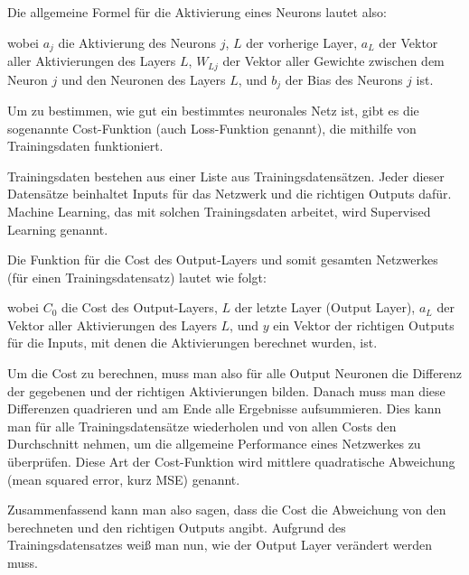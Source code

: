 \documentclass[11pt]{scrartcl}
\begin{document}
	Die allgemeine Formel für die Aktivierung eines Neurons lautet also:


	\form{
	\[
		\sig(x)=\frac{1}{1+e^{-x}}
		\]
	\[
		a_{j} = \sig\left(\sum_{L} (a_{L} * W_{Lj}) + b_{j}\right)
		\]}
	
	\noindent wobei $a_j$ die Aktivierung des Neurons $j$, $L$ der vorherige Layer, $a_L$ der Vektor aller Aktivierungen des Layers $L$, $W_{Lj}$ der Vektor aller Gewichte zwischen dem Neuron $j$ und den Neuronen des Layers $L$, und $b_j$ der Bias des Neurons $j$ ist. \cite{brotcrunsher:forwardpass}	
	

	Um zu bestimmen, wie gut ein bestimmtes neuronales Netz ist, gibt es die sogenannte Cost-Funktion (auch Loss-Funktion genannt), die mithilfe von Trainingsdaten funktioniert.
	
	Trainingsdaten bestehen aus einer Liste aus Trainingsdatensätzen. Jeder dieser Datensätze beinhaltet Inputs für das Netzwerk und die richtigen Outputs dafür. Machine Learning, das mit solchen Trainingsdaten arbeitet, wird Supervised Learning genannt.

	Die Funktion für die Cost des Output-Layers und somit gesamten Netzwerkes (für einen Trainingsdatensatz) lautet wie folgt:

	\form{ \[
		C_0 = (a_L - y)^2
	\]}


	\noindent wobei $C_0$ die Cost des Output-Layers, $L$ der letzte Layer (Output Layer), $a_L$ der Vektor aller Aktivierungen des Layers $L$, und $y$ ein Vektor der richtigen Outputs für die Inputs, mit denen die Aktivierungen berechnet wurden, ist. 
	
	Um die Cost zu berechnen, muss man also für alle Output Neuronen die Differenz der gegebenen und der richtigen Aktivierungen bilden. Danach muss man diese Differenzen quadrieren und am Ende alle Ergebnisse aufsummieren. Dies kann man für alle Trainingsdatensätze wiederholen und von allen Costs den Durchschnitt nehmen, um die allgemeine Performance eines Netzwerkes zu überprüfen. Diese Art der Cost-Funktion wird mittlere quadratische Abweichung (mean squared error, kurz MSE) genannt. 
	
	Zusammenfassend kann man also sagen, dass die Cost die Abweichung von den berechneten und den richtigen Outputs angibt. Aufgrund des Trainingsdatensatzes weiß man nun, wie der Output Layer verändert werden
	muss.

\end{document}
